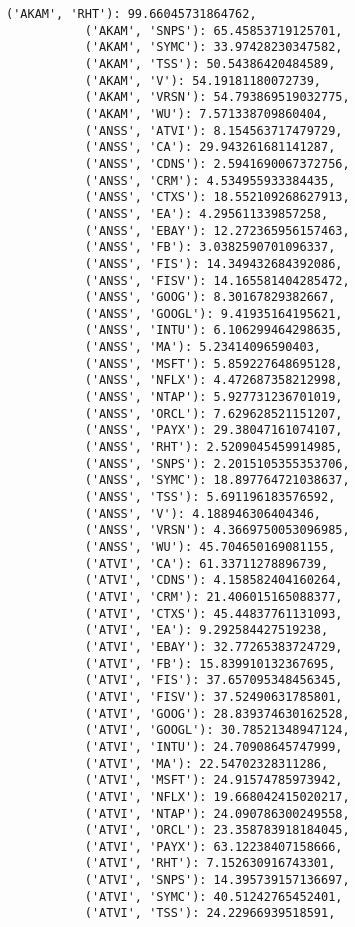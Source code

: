 \documentclass[11pt]{article}
\begin{document}
\begin{Verbatim}[commandchars=\\\{\}]
           ('AKAM', 'RHT'): 99.66045731864762,
           ('AKAM', 'SNPS'): 65.45853719125701,
           ('AKAM', 'SYMC'): 33.97428230347582,
           ('AKAM', 'TSS'): 50.54386420484589,
           ('AKAM', 'V'): 54.19181180072739,
           ('AKAM', 'VRSN'): 54.793869519032775,
           ('AKAM', 'WU'): 7.571338709860404,
           ('ANSS', 'ATVI'): 8.154563717479729,
           ('ANSS', 'CA'): 29.943261681141287,
           ('ANSS', 'CDNS'): 2.5941690067372756,
           ('ANSS', 'CRM'): 4.534955933384435,
           ('ANSS', 'CTXS'): 18.552109268627913,
           ('ANSS', 'EA'): 4.295611339857258,
           ('ANSS', 'EBAY'): 12.272365956157463,
           ('ANSS', 'FB'): 3.0382590701096337,
           ('ANSS', 'FIS'): 14.349432684392086,
           ('ANSS', 'FISV'): 14.165581404285472,
           ('ANSS', 'GOOG'): 8.30167829382667,
           ('ANSS', 'GOOGL'): 9.41935164195621,
           ('ANSS', 'INTU'): 6.106299464298635,
           ('ANSS', 'MA'): 5.23414096590403,
           ('ANSS', 'MSFT'): 5.859227648695128,
           ('ANSS', 'NFLX'): 4.472687358212998,
           ('ANSS', 'NTAP'): 5.927731236701019,
           ('ANSS', 'ORCL'): 7.629628521151207,
           ('ANSS', 'PAYX'): 29.38047161074107,
           ('ANSS', 'RHT'): 2.5209045459914985,
           ('ANSS', 'SNPS'): 2.2015105355353706,
           ('ANSS', 'SYMC'): 18.897764721038637,
           ('ANSS', 'TSS'): 5.691196183576592,
           ('ANSS', 'V'): 4.188946306404346,
           ('ANSS', 'VRSN'): 4.3669750053096985,
           ('ANSS', 'WU'): 45.704650169081155,
           ('ATVI', 'CA'): 61.33711278896739,
           ('ATVI', 'CDNS'): 4.158582404160264,
           ('ATVI', 'CRM'): 21.406015165088377,
           ('ATVI', 'CTXS'): 45.44837761131093,
           ('ATVI', 'EA'): 9.292584427519238,
           ('ATVI', 'EBAY'): 32.77265383724729,
           ('ATVI', 'FB'): 15.839910132367695,
           ('ATVI', 'FIS'): 37.657095348456345,
           ('ATVI', 'FISV'): 37.52490631785801,
           ('ATVI', 'GOOG'): 28.839374630162528,
           ('ATVI', 'GOOGL'): 30.78521348947124,
           ('ATVI', 'INTU'): 24.70908645747999,
           ('ATVI', 'MA'): 22.54702328311286,
           ('ATVI', 'MSFT'): 24.91574785973942,
           ('ATVI', 'NFLX'): 19.668042415020217,
           ('ATVI', 'NTAP'): 24.090786300249558,
           ('ATVI', 'ORCL'): 23.358783918184045,
           ('ATVI', 'PAYX'): 63.12238407158666,
           ('ATVI', 'RHT'): 7.152630916743301,
           ('ATVI', 'SNPS'): 14.395739157136697,
           ('ATVI', 'SYMC'): 40.51242765452401,
           ('ATVI', 'TSS'): 24.22966939518591,

\end{Verbatim}
\end{document}
